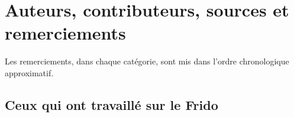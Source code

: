 \section{Auteurs, contributeurs, sources et remerciements}
\label{SECooINTROremerciements}

Les remerciements, dans chaque catégorie, sont mis dans l'ordre chronologique approximatif.

\subsection{Ceux qui ont travaillé sur le Frido}
\label{SUBooINTROremerciementsFrido}


